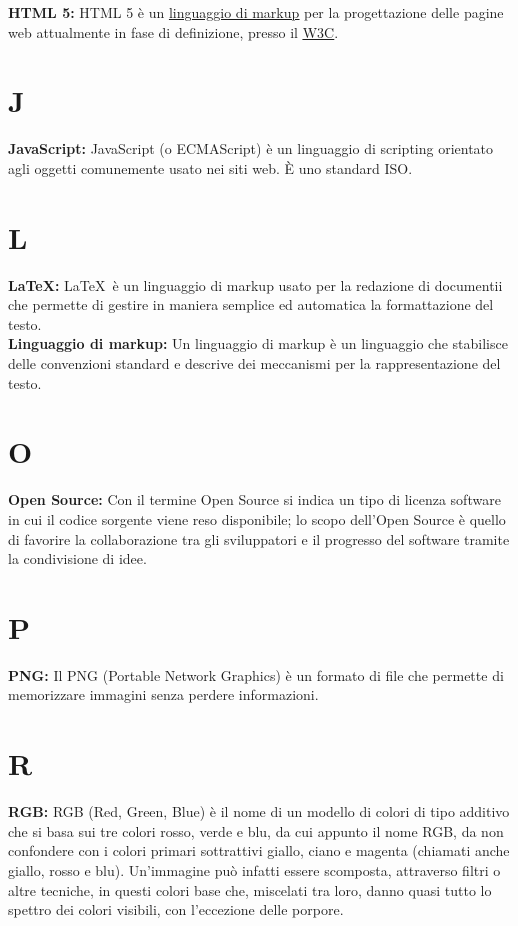 \hypertarget{html5}{}
\textbf{HTML 5:}
HTML 5 \` e un \hyperlink{linguaggio di markup}{\underline{linguaggio di markup}} per la progettazione delle pagine web attualmente in fase di definizione, presso il \hyperlink{w3c}{\underline{W3C}}.\\ 

\section*{J}
\hypertarget{javascript}{}
\textbf{JavaScript:}
JavaScript (o ECMAScript) \`e un linguaggio di scripting orientato agli oggetti comunemente usato nei siti web. \`E  uno standard ISO.\\

\section*{L}
\hypertarget{latex}{}
\textbf{\LaTeX:}
\LaTeX \ \`e un linguaggio di markup usato per la redazione di documentii che permette di gestire in maniera semplice ed automatica la formattazione del testo.\\

\textbf{Linguaggio di markup:}
\hypertarget{markup}{}
Un linguaggio di markup \`e un linguaggio che stabilisce delle convenzioni standard e descrive dei meccanismi per la rappresentazione del testo.\\

\section*{O}
\hypertarget{opensource}{}
\textbf{Open Source:}
Con il termine Open Source si indica un tipo di licenza software in cui il codice sorgente viene reso disponibile; lo scopo dell'Open Source \`e quello di favorire la collaborazione tra gli sviluppatori e il progresso del software tramite la condivisione di idee.\\

\section*{P}
\hypertarget{png}{}
\textbf{PNG:}
Il PNG (Portable Network Graphics) \`e un formato di file che permette di memorizzare immagini senza perdere informazioni.\\

\section*{R}
\hypertarget{rgb}{}
\textbf{RGB:}
RGB (Red, Green, Blue) \`e  il nome di un modello di colori di tipo additivo che si basa sui tre colori rosso, verde e blu, da cui appunto il nome RGB, da non confondere con i colori primari sottrattivi giallo, ciano e magenta (chiamati anche giallo, rosso e blu).
Un'immagine pu\`o  infatti essere scomposta, attraverso filtri o altre tecniche, in questi colori base che, miscelati tra loro, danno quasi tutto lo spettro dei colori visibili, con l'eccezione delle porpore.\\

